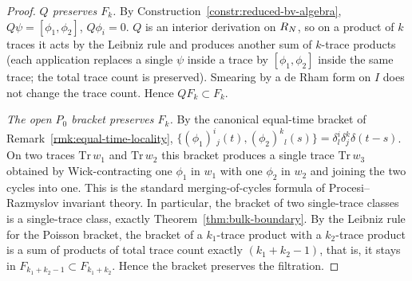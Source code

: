 \begin{proof}
  \emph{$Q$ preserves $F_k$.}  By
  Construction~\ref{constr:reduced-bv-algebra},
  $Q\psi=[\phi_1,\phi_2]$, $Q\phi_i=0$.  $Q$ is an interior derivation
  on $R_N$, so on a product of $k$ traces it acts by the Leibniz
  rule and produces another sum of $k$-trace products
  (each application replaces a single $\psi$ inside a trace by
  $[\phi_1,\phi_2]$ inside the same trace; the total trace count is
  preserved).  Smearing by a de Rham form on $I$ does not change the
  trace count.  Hence $Q F_k\subset F_k$.

  \emph{The open $P_0$ bracket preserves $F_k$.}  By the canonical
  equal-time bracket of
  Remark~\ref{rmk:equal-time-locality},
  $\{(\phi_1)^i{}_j(t),(\phi_2)^k{}_l(s)\}=\delta^i_l\delta^k_j\delta(t-s)$.
  On two traces $\mathrm{Tr}\,w_1$ and $\mathrm{Tr}\,w_2$ this bracket
  produces a single trace
  $\mathrm{Tr}\,w_3$ obtained by Wick-contracting one $\phi_1$ in $w_1$
  with one $\phi_2$ in $w_2$ and joining the two cycles into one.
  This is the standard merging-of-cycles formula of Procesi--Razmyslov
  invariant theory.  In particular, the bracket of two single-trace
  classes is a single-trace class, exactly Theorem~\ref{thm:bulk-boundary}.
  By the Leibniz rule for the Poisson bracket, the bracket of a
  $k_1$-trace product with a $k_2$-trace product is a sum of products
  of total trace count exactly $(k_1+k_2-1)$, that is, it stays in
  $F_{k_1+k_2-1}\subset F_{k_1+k_2}$.  Hence the bracket preserves the
  filtration.
\end{proof}

